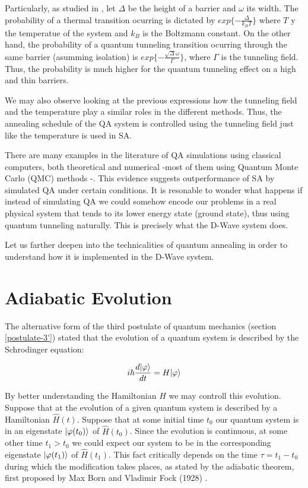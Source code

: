 Particularly, as studied in \cite{Ray1989}, let $\Delta$ be the height of a barrier and $\omega$ its width. The probability of a thermal transition ocurring is dictated by $exp\{-\frac{\Delta}{k_B T}\}$ where $T$ y the temperatue of the system and $k_B$ is the Boltzmann constant. On the other hand, the probability of a quantum tunneling transition ocurring through the same barrier (asumming isolation) is $exp\{-\frac{\sqrt \Delta \omega}{\Gamma}\}$, where $\Gamma$ is the tunneling field. Thus, the probability is much higher for the quantum tunneling effect on a high and thin barriers.

We may also observe looking at the previous expressions how the tunneling field and the temperature play a similar roles in the different methods. Thus, the annealing schedule of the QA system is controlled using the tunneling field just like the temperature is used in SA.

There are many examples in the literature of QA simulations using classical computers, both theoretical \cite{Morita2008} and numerical -most of them using Quantum Monte Carlo (QMC) methods \cite{Isakov2016} \cite{Farhi2000}-. This evidence suggests outperformance of SA by simulated QA under certain conditions. It is resonable to wonder what happens if instead of simulating QA we could somehow encode our problems in a real physical system that tends to its lower energy state (ground state), thus using quantum tunneling naturally. This is precisely what the D-Wave system does.

Let us farther deepen into the technicalities of quantum annealing in order to understand how it is implemented in the D-Wave system.


\section{Adiabatic Evolution}


The alternative form of the third postulate of quantum mechanics (section \ref{postulate-3'}) stated that the evolution of a quantum system is described by the Schrodinger equation:

$$ i \hbar \frac{d|\varphi\rangle}{dt} = H|\varphi\rangle $$

By better understanding the Hamiltonian $H$ we may controll this evolution. Suppose that at the evolution of a given quantum system is described by a Hamiltonian $\hat H(t)$. Suppose that at some initial time $t_0$ our quantum system is in an eigenstate $|\varphi(t_0)\rangle$ of $\hat H(t_0)$. Since the evolution is continuous, at some other time $t_1 > t_0$ we could expect our system to be in the corresponding eigenstate $|\varphi(t_1)\rangle$ of $\hat H(t_1)$. This fact critically depends on the time $\tau = t_1 - t_0$ during which the modification takes places, as stated by the adiabatic theorem, first proposed by Max Born and Vladimir Fock (1928) \cite{Born1928}.


